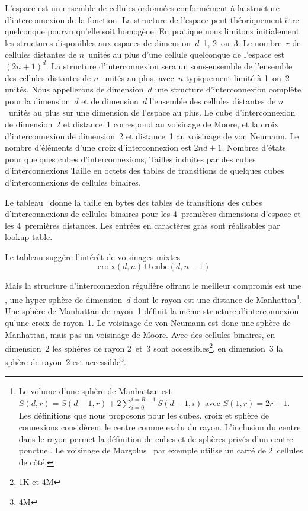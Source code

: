 L'espace est un ensemble de cellules ordonnées conformément à la
structure d'interconnexion de la fonction. %
La structure de l'espace peut théoriquement être quelconque pourvu
qu'elle soit homogène. %
En pratique nous limitons initialement les structures disponibles aux
espaces de dimension~$d$~1, 2~ou~3. %
%
Le nombre~$r$ de cellules distantes de $n$~unités au plus d'une
cellule quelconque de l'espace est $(2n + 1)^{d}$. %
La structure d'interconnexion sera un sous-ensemble de l'ensemble des
cellules distantes de $n$~unités au plus, avec~$n$ typiquement limité
à 1~ou~2 unités. %
Nous appellerons  de dimension~$d$ une
structure d'interconnexion complète pour la dimension~$d$ et
 de dimension~$d$ l'ensemble des
cellules distantes de $n$~unités au plus sur une dimension de l'espace
au plus. %
Le cube d'interconnexion de dimension~2 et distance~1 correspond au
voisinage de Moore, et la croix d'interconnexion de dimension~2 et
distance~1 au voisinage de von Neumann. %
Le nombre d'éléments d'une croix d'interconnexion est $2 n d + 1$.
%
{Nombres d'états pour quelques cubes d'interconnexions,}%
{Tailles induites par des cubes d'interconnexions}%
{Taille en octets des tables de transitions de quelques cubes
  d'interconnexions de cellules binaires.}

Le tableau~ donne la taille en bytes
des tables de transitions des cubes d'interconnexions de cellules
binaires pour les 4~premières dimensions d'espace et les 4~premières
distances. %
Les entrées en caractères gras sont réalisables par lookup-table.

Le tableau  suggère l'intérêt de
voisinages mixtes
\[\text{croix}(d, n) \cup \text{cube}(d, n - 1)\]

Mais la structure d'interconnexion régulière offrant le meilleur
compromis  est une , une hyper-sphère de dimension~$d$ dont le rayon est une
distance de Manhattan\footnote{%
  Le volume d'une sphère de Manhattan est %
  $S(d, r) = S(d - 1, r) + 2 \sum_{i=0}^{i=R-1} S(d - 1, i)$ %
  avec $S(1, r) = 2r + 1$. %
  Les définitions que nous proposons pour les cubes, croix et sphère de
  connexions considèrent le centre comme exclu du rayon. %
  L'inclusion du centre dans le rayon permet la définition de cubes et
  de sphères privés d'un centre ponctuel. %
  Le voisinage de Margolus~\cite[]{Toffoli87} par exemple utilise un
  carré de 2~cellules de côté.}. %
Une sphère de Manhattan de rayon~1 définit la même structure
d'interconnexion qu'une croix de rayon~1. %
Le voisinage de von Neumann est donc une sphère de Manhattan, mais pas
un voisinage de Moore. %
Avec des cellules binaires, en dimension~2 les sphères de rayon
2~et~3 sont accessibles\footnote{1K et 4M}, en dimension~3 la sphère
de rayon~2 est accessible\footnote{4M}.

